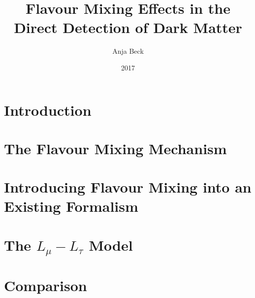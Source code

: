 \documentclass[
  tucolor,
  BCOR=12mm,     %
  parskip=half,  %
  open=any,      %
  cleardoublepage=plain,  %
]{tudothesis}
\author{Anja Beck}
\title{Flavour Mixing Effects in the Direct Detection of Dark Matter}
\date{2017}
\begin{document}
\frontmatter
%
\maketitle

\makecorrectorpage


\cleardoublepage
\tableofcontents

\mainmatter
\chapter{Introduction}

\chapter{The Flavour Mixing Mechanism}

\chapter{Introducing Flavour Mixing into an Existing Formalism\label{sec:formalism}}

\chapter{The \texorpdfstring{$L_\mu-L_\tau$}{TEXT} Model\label{sec:NewInt}}

\chapter{Comparison}

%

%
\todos
\cleardoublepage
\backmatter
\printbibliography

\cleardoublepage

\end{document}
